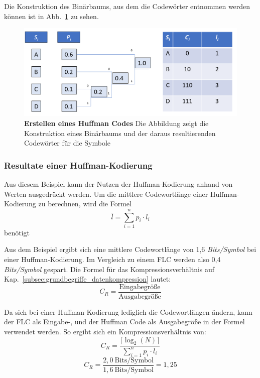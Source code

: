 Die Konstruktion des Binärbaums, aus dem die Codewörter entnommen werden können ist in Abb.~\ref{fig:huffman_example} zu sehen.

\begin{figure}[htb]
  \centering  
  \includegraphics[scale=0.4]{Bilder/Huffmancode_beispiel.png}
  \caption[Huffman Code Beispiel]{\textbf{Erstellen eines Huffman Codes} Die Abbildung zeigt die Konstruktion eines Binärbaums und der daraus resultierenden Codewörter für die Symbole}
  \label{fig:huffman_example}
\end{figure}

\subsubsection{Resultate einer Huffman-Kodierung}
\label{subsec:huffman_res}
Aus diesem Beispiel kann der Nutzen der Huffman-Kodierung anhand von Werten ausgedrückt werden. \newline
Um die mittlere Codewortlänge einer Huffman-Kodierung zu berechnen, wird die Formel
\begin{equation*}
\bar{l} = \sum_{i=1}^{n} p_i \cdot l_i
\end{equation*}
benötigt \newline

Aus dem Beispiel ergibt sich eine mittlere Codewortlänge von 1,6 \textit{Bits/Symbol} bei einer Huffman-Kodierung.
Im Vergleich zu einem FLC werden also 0,4 \textit{Bits/Symbol} gespart. 
Die Formel für das Kompressionsverhältnis auf Kap.~\ref{subsec:grundbegriffe_datenkompression} lautet:
\begin{equation*}
C_R = \frac{\text{Eingabegröße}}{\text{Ausgabegröße}}
\end{equation*}

Da sich bei einer Huffman-Kodierung lediglich die Codewortlängen ändern, kann der FLC als Eingabe-, und der Huffman Code als Ausgabegröße in der Formel verwendet werden.
So ergibt sich ein Kompressionsverhältnis von:
\begin{equation*}
C_R = \frac{\lceil \log_2(N) \rceil}{\sum_{i=1}^{n} p_i \cdot l_i}
\end{equation*}
\begin{equation*}
C_R = \frac{2,0 \ \text{Bits/Symbol}}{1,6 \ \text{Bits/Symbol}} = 1,25
\end{equation*}

